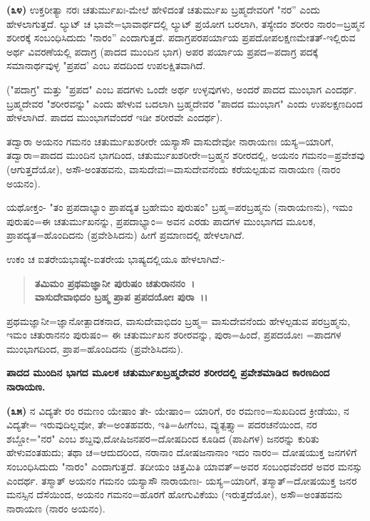 \textbf{(೩೪)} ಉಕ್ತರೀತ್ಯಾ ನರಃ ಚತುರ್ಮುಖಃ-ಮೇಲೆ ಹೇಳಿದಂತೆ ಚತುರ್ಮುಖ ಬ್ರಹ್ಮದೇವರಿಗೆ "ನರ'' ಎಂದು ಹೇಳಲಾಗುತ್ತದೆ. ಲ್ಯುಟ್ ಚ ಭಾವೇ=ಭಾವಾರ್ಥದಲ್ಲಿ ಲ್ಯುಟ್ ಪ್ರಯೋಗ ಬರಲಾಗಿ, ತಸ್ಯೇದಂ ಶರೀರಂ ನಾರಂ=ಬ್ರಹ್ಮನ ಶರೀರಕ್ಕೆ ಸಂಬಂಧಿಸಿದುದು "ನಾರಂ'' ಎಂದಾಗುತ್ತದೆ. ಪದಾಗ್ರಪರಪರ್ಯಾಯ ಪ್ರಪದೋಪಲಕ್ಷಣಮೇತತ್-ಇಲ್ಲಿರುವ ಅರ್ಥ ವಿವರಣೆಯಲ್ಲಿ ಪದಾಗ್ರ (ಪಾದದ ಮುಂದಿನ ಭಾಗ) ಅಪರ ಪರ್ಯಾಯ ಪ್ರಪದ=ಪದಾಗ್ರ ಪದಕ್ಕೆ ಸಮಾನಾರ್ಥವುಳ್ಳ "ಪ್ರಪದ' ಎಂಬ ಪದದಿಂದ ಉಪಲಕ್ಷಿತವಾಗಿದೆ.

("ಪದಾಗ್ರ" ಮತ್ತು "ಪ್ರಪದ" ಎಂಬ ಪದಗಳು ಒಂದೇ ಅರ್ಥ ಉಳ್ಳವುಗಳು, ಅಂದರೆ ಪಾದದ ಮುಂಭಾಗ ಎಂದರ್ಥ. ಬ್ರಹ್ಮದೇವರ "ಶರೀರವನ್ನು" ಎಂದು ಹೇಳುವ ಬದಲಾಗಿ ಬ್ರಹ್ಮದೇವರ "ಪಾದದ ಮುಂಭಾಗ" ಎಂದು ಉಪಲಕ್ಷಣದಿಂದ ಹೇಳಲಾಗಿದೆ. ಪಾದದ ಮುಂಭಾಗವೆಂದರೆ ಇಡೀ ಶರೀರವೇ ಎಂದರ್ಥ).

ತದ್ವಾರಾ ಅಯನಂ ಗಮನಂ ಚತುರ್ಮುಖಶರೀರೇ ಯಸ್ಯಾಸೌ ವಾಸುದೇವೋ ನಾರಾಯಣಃ ಯಸ್ಯ=ಯಾರಿಗೆ, ತದ್ವಾರಾ=ಪಾದದ ಮುಂದಿನ ಭಾಗದಿಂದ, ಚತುರ್ಮುಖಶರೀರೇ=ಬ್ರಹ್ಮನ ಶರೀರದಲ್ಲಿ, ಅಯನಂ ಗಮನಂ=ಪ್ರವೇಶವು (ಆಗುತ್ತದೆಯೋ), ಅಸೌ-ಅಂತಹವನು, ವಾಸುದೇವಃ=ವಾಸುದೇವನೆಂದು ಕರೆಯಲ್ಪಡುವ ನಾರಾಯಣ (ನಾರಂ ಅಯನಂ).

ಯಥೋಕ್ತಂ- "ತಂ ಪ್ರಪದಾಭ್ಯಾಂ ಪ್ರಾಪದ್ಯತ ಬ್ರಹೇಮಂ ಪುರುಷಂ" ಬ್ರಹ್ಮ=\-ಪರಬ್ರಹ್ಮನು (ನಾರಾಯಣನು), ಇಮಂ ಪುರುಷಂ=ಈ ಚತುರ್ಮುಖನನ್ನು, ಪ್ರಪದಾಭ್ಯಾಂ= ಅವನ ಎರಡು ಪಾದಗಳ ಮುಂಭಾಗದ ಮೂಲಕ, ಪ್ರಾಪದ್ಯತ=ಹೊಂದಿದನು (ಪ್ರವೇಶಿಸಿದನು) ಹೀಗೆ ಪ್ರಮಾಣದಲ್ಲಿ ಹೇಳಲಾಗಿದೆ.

ಉಕಂ ಚ ಐತರೇಯಭಾಷ್ಯೇ-ಐತರೇಯ ಭಾಷ್ಯದಲ್ಲಿಯೂ ಹೇಳಲಾಗಿದೆ:-

\begin{verse}
\textbf{ತಮಿಮಂ ಪ್ರಥಮಜ್ಞಾನೀ ಪುರುಷಂ ಚತುರಾನನಂ~।}\\\textbf{ವಾಸುದೇವಾಭಿದಂ ಬ್ರಹ್ಮ ಪ್ರಾಪ ಪ್ರಪದಯೋಃ ಪುರಾ~।।}
\end{verse}

ಪ್ರಥಮಜ್ಞಾನೀ=ಜ್ಞಾನೋತ್ಪಾದಕನಾದ, ವಾಸುದೇವಾಭಿದಂ ಬ್ರಹ್ಮ= ವಾಸುದೇವನೆಂದು ಹೇಳಲ್ಪಡುವ ಪರಬ್ರಹ್ಮನು, ಇಮಂ ಚತುರಾನನಂ ಪುರುಷಂ= ಈ ಚತುರ್ಮುಖನ ಶರೀರವನ್ನು, ಪುರಾ=ಹಿಂದೆ, ಪ್ರಪದಯೋಃ =ಪಾದಗಳ ಮುಂಭಾಗದಿಂದ, ಪ್ರಾಪ=ಹೊಂದಿದನು (ಪ್ರವೇಶಿಸಿದನು).

\begin{center}
\textbf{ಪಾದದ ಮುಂದಿನ ಭಾಗದ ಮೂಲಕ ಚತುರ್ಮುಖಬ್ರಹ್ಮದೇವರ ಶರೀರದಲ್ಲಿ ಪ್ರವೇಶಮಾಡಿದ ಕಾರಣದಿಂದ ನಾರಾಯಣ.}
\end{center}

\textbf{(೩೫)} ನ ವಿದ್ಯತೇ ರಂ ರಮಣಂ ಯೇಷಾಂ ತೇ- ಯೇಷಾಂ= ಯಾರಿಗೆ, ರಂ ರಮಣಂ=ಸುಖದಿಂದ ಕ್ರೀಡೆಯು, ನ ವಿದ್ಯತೇ= ಇರುವುದಿಲ್ಲವೋ, ತೇ=ಅಂತಹವರು, ಇತಿ=ಹೀಗೆಂಬ, ವ್ಯುತ್ಪತ್ತ್ಯಾ= ಪದರಚನೆಯಿಂದ, ನರ ಶಬ್ದೋ="ನರ" ಎಂಬ ಶಬ್ದವು,\break ದೋಷಿಜನಪರ=ದೋಷದಿಂದ ಕೂಡಿದ (ಪಾಪಿಗಳ) ಜನರನ್ನು ಕುರಿತು ಹೇಳುವಂತಹುದು; ತಥಾ ಚ=ಆದುದರಿಂದ, ನರಾನಾಂ ದೋಷಜನಾನಾಂ ಇದಂ ನಾರಂ= ದೋಷಯುಕ್ತ ಜನಗಳಿಗೆ ಸಂಬಂಧಿಸಿದುದು "ನಾರಂ" ಎಂದಾಗುತ್ತದೆ. ತದೀಯಂ ಚಿತ್ತಮಿತಿ ಯಾವತ್=ಅವರ ಸಂಬಂಧವೆಂದರೆ ಅವರ ಮನಸ್ಸು ಎಂದರ್ಥ. ತಸ್ಮಾತ್ ಅಯನಂ ಗಮನಂ ಯಸ್ಯಾಸೌ ನಾರಾಯಣಃ- ಯಸ್ಯ=ಯಾರಿಗೆ, ತಸ್ಮಾತ್=ದೋಷಯುಕ್ತ ಜನರ ಮನಸ್ಸಿನ ದೆಸೆಯಿಂದ, ಅಯನಂ ಗಮನಂ=ಹೊರಗೆ ಹೋಗುವಿಕೆಯು (ಇರುತ್ತದೆಯೋ), ಅಸೌ=ಅಂತಹವನು ನಾರಾಯಣ (ನಾರಂ ಅಯನಂ).

